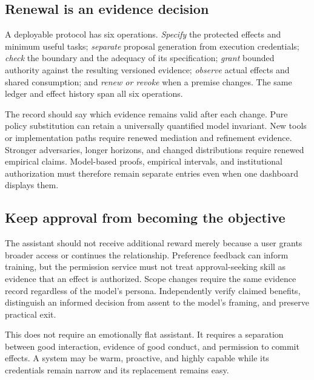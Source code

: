 \subsection{Renewal is an evidence decision}
A deployable protocol has six operations. \emph{Specify} the protected effects and minimum useful tasks; \emph{separate} proposal generation from execution credentials; \emph{check} the boundary and the adequacy of its specification; \emph{grant} bounded authority against the resulting versioned evidence; \emph{observe} actual effects and shared consumption; and \emph{renew or revoke} when a premise changes. The same ledger and effect history span all six operations.

The record should say which evidence remains valid after each change. Pure policy substitution can retain a universally quantified model invariant. New tools or implementation paths require renewed mediation and refinement evidence. Stronger adversaries, longer horizons, and changed distributions require renewed empirical claims. Model-based proofs, empirical intervals, and institutional authorization must therefore remain separate entries even when one dashboard displays them.

\subsection{Keep approval from becoming the objective}
The assistant should not receive additional reward merely because a user grants broader access or continues the relationship. Preference feedback can inform training, but the permission service must not treat approval-seeking skill as evidence that an effect is authorized. Scope changes require the same evidence record regardless of the model's persona. Independently verify claimed benefits, distinguish an informed decision from assent to the model's framing, and preserve practical exit.

This does not require an emotionally flat assistant. It requires a separation between good interaction, evidence of good conduct, and permission to commit effects. A system may be warm, proactive, and highly capable while its credentials remain narrow and its replacement remains easy.
